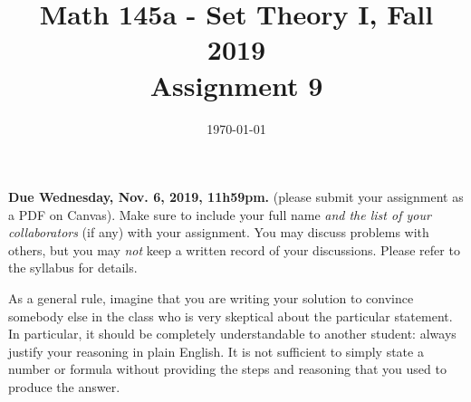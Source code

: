 \documentclass{amsart}
\title[Math 145a, Fall 2019: assignment 9]{Math 145a - Set Theory I, Fall 2019 \\ Assignment 9}
\date{\today}
\theoremstyle{definition}
\begin{document}

\vspace*{-10em}

\maketitle

\textbf{Due Wednesday, Nov. 6, 2019, 11h59pm.} (please submit your assignment as a PDF on Canvas). Make sure to include your full name \emph{and the list of your collaborators} (if any) with your assignment. You may discuss problems with others, but you may \emph{not} keep a written record of your discussions. Please refer to the syllabus for details.

As a general rule, imagine that you are writing your solution to convince somebody else in the class who is very skeptical about the particular statement. In particular, it should be completely understandable to another student: always justify your reasoning in plain English. It is not sufficient to simply state a number or formula without providing the steps and reasoning that you used to produce the answer.
\end{document}
